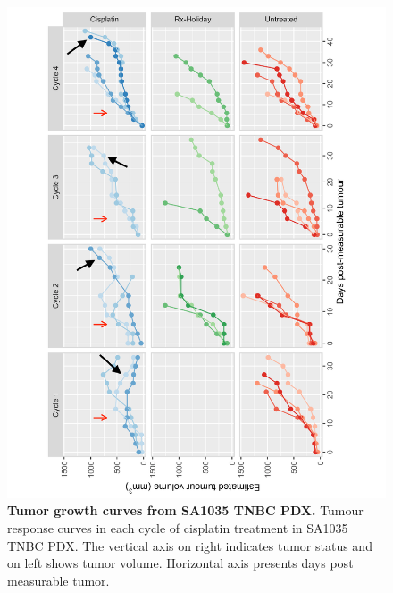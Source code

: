 \begin{figure}
\centering
\includegraphics[width=\textwidth]{Figures/SA1035_AllCyclesCisplatin.pdf}
	
\caption[Tumor growth curves from SA1035 TNBC PDX]
	{\small
\textbf{Tumor growth curves from SA1035 TNBC PDX.}
Tumour response curves in each cycle of cisplatin treatment in SA1035 TNBC PDX. The vertical axis on right indicates tumor status and on left shows tumor volume. Horizontal axis presents days post measurable tumor.
}
	\label{fig:Untreated timeseries growth curves only}
\end{figure}
